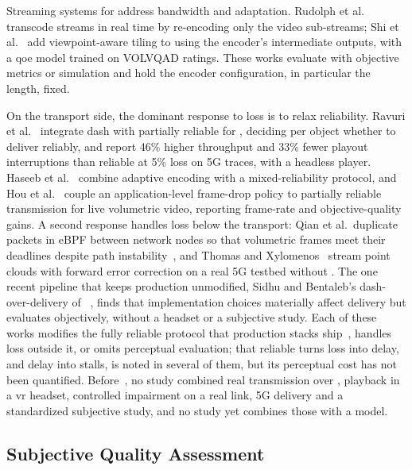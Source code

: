 Streaming systems for \vpcc address bandwidth and adaptation. Rudolph
et al.~\cite{rudolph2025rabbit} transcode \vpcc streams in real time by
re-encoding only the video sub-streams; Shi et al.~\cite{qv424} add
viewpoint-aware tiling to \vpcc using the encoder's intermediate
outputs, with a \gls{qoe} model trained on VOLVQAD ratings.
These works evaluate with objective metrics or
simulation and hold the encoder configuration, in particular the \gof
length, fixed.

On the transport side, the dominant response to loss is to relax
reliability. Ravuri et al.~\cite{ravuri2023} integrate \gls{dash} with
partially reliable \quic for \vpcc, deciding per object whether to
deliver reliably, and report 46\% higher throughput and 33\% fewer
playout interruptions than reliable \quic at 5\% loss on 5G traces,
with a headless player. Haseeb et al.~\cite{haseeb2025} combine
adaptive encoding with a mixed-reliability \quic protocol, and Hou et
al.~\cite{hou2026cetus}
couple an application-level frame-drop policy to partially reliable
transmission for live volumetric video, reporting frame-rate and
objective-quality gains. A second response handles loss below the
transport: Qian et al.\ duplicate packets in eBPF between network nodes
so that volumetric frames meet their deadlines despite path
instability~\cite{qian2024ebpf}, and Thomas and
Xylomenos~\cite{thomas2025} stream point clouds with forward error
correction on a real 5G testbed without \quic. The one recent pipeline
that keeps production \quic unmodified, Sidhu and Bentaleb's
\gls{dash}-over-\quic delivery of \gpcc~\cite{gpcc2026quic}, finds that
\quic implementation choices materially affect delivery but evaluates
objectively, without a headset or a subjective study. Each of these
works modifies the fully reliable protocol that production stacks
ship~\cite{rfc9000}, handles loss outside it, or omits perceptual
evaluation; that reliable \quic turns loss into delay, and delay into
\gof stalls, is noted in several of them, but its perceptual cost has
not been quantified. Before~\cite{mosaic2026}, no study combined real
\vpcc transmission over \quic, playback in a \gls{vr} headset,
controlled impairment on a real link, 5G delivery and a standardized
subjective study, and no study yet combines those with a model.

\subsection{Subjective Quality Assessment}
\label{sec:rw-subjective}

